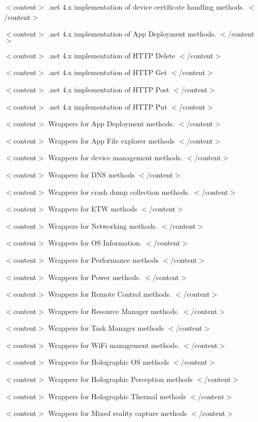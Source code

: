 $<$content$>$ .net 4.\+x implementation of device certificate handling methods. $<$/content$>$

$<$content$>$ .net 4.\+x implementation of App Deployment methods. $<$/content$>$

$<$content$>$ .net 4.\+x implementation of H\+T\+TP Delete $<$/content$>$

$<$content$>$ .net 4.\+x implementation of H\+T\+TP Get $<$/content$>$

$<$content$>$ .net 4.\+x implementation of H\+T\+TP Post $<$/content$>$

$<$content$>$ .net 4.\+x implementation of H\+T\+TP Put $<$/content$>$

$<$content$>$ Wrappers for App Deployment methods. $<$/content$>$

$<$content$>$ Wrappers for App File explorer methods $<$/content$>$

$<$content$>$ Wrappers for device management methods. $<$/content$>$

$<$content$>$ Wrappers for D\+NS methods $<$/content$>$

$<$content$>$ Wrappers for crash dump collection methods. $<$/content$>$

$<$content$>$ Wrappers for E\+TW methods $<$/content$>$

$<$content$>$ Wrappers for Networking methods. $<$/content$>$

$<$content$>$ Wrappers for OS Information. $<$/content$>$

$<$content$>$ Wrappers for Performance methods $<$/content$>$

$<$content$>$ Wrappers for Power methods. $<$/content$>$

$<$content$>$ Wrappers for Remote Control methods. $<$/content$>$

$<$content$>$ Wrappers for Resource Manager methods. $<$/content$>$

$<$content$>$ Wrappers for Task Manager methods $<$/content$>$

$<$content$>$ Wrappers for Wi\+Fi management methods. $<$/content$>$

$<$content$>$ Wrappers for Holographic OS methods $<$/content$>$

$<$content$>$ Wrappers for Holographic Perception methods $<$/content$>$

$<$content$>$ Wrappers for Holographic Thermal methods $<$/content$>$

$<$content$>$ Wrappers for Mixed reality capture methods $<$/content$>$

